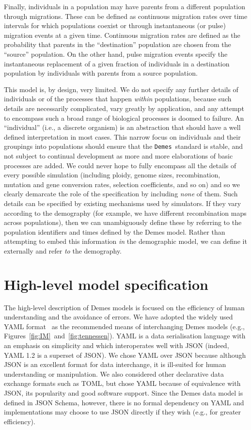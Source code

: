 \documentclass[11pt]{article}
\newcommand{\Demes}[0]{\texttt{Demes}}
\begin{document}
Finally, individuals in a population may have parents from a different
population through migrations. These can be defined as continuous migration
rates over time intervals for which populations coexist or through
instantaneous (or pulse) migration events at a given time. Continuous migration
rates are defined as the probability that parents in the ``destination''
population are chosen from the ``source'' population.
On the other hand, pulse
migration events specify the instantaneous replacement of a given fraction of
individuals in a destination population by individuals with parents from a
source population.

This model is, by design, very limited. We do not specify any further details of
individuals or of the processes that happen \emph{within} populations,
because such details are necessarily complicated, vary greatly by
application, and any attempt to encompass such a broad range of biological
processes is doomed to failure. An ``individual'' (i.e., a discrete
organism) is an abstraction that should have a well defined interpretation
in most cases.
This narrow focus on individuals and their groupings into populations
should ensure that the \Demes\ standard is stable, and not subject to
continual development as more and more elaborations of basic processes
are added. We could never hope to fully encompass all the details
of every possible simulation (including ploidy,
genome sizes, recombination, mutation and gene conversion rates,
selection coefficients, and so on) and so we clearly demarcate the
role of the specification by including \emph{none} of them.
Such details can be specified by existing mechanisms used by
simulators. If they vary according to the demography (for example,
we have different recombination maps across populations), then
we can unambiguously define these by referring to the population
identifiers and times defined by the Demes model. Rather than attempting
to embed this information \emph{in} the demographic model, we
can define it externally and refer \emph{to} the demography.

\section{High-level model specification}\label{sec:appendix-spec}

The high-level description of Demes models is focused on the efficiency of
human understanding and the avoidance of errors. We have adopted the widely
used YAML format~\citep{ben2009yaml} as the recommended means of interchanging
Demes models (e.g., Figures~\ref{fig:IM}~and~\ref{fig:tennessen}). YAML is a data
serialisation language with an emphasis on simplicity and which interoperates well
with JSON (indeed, YAML 1.2 is a superset of JSON). We chose YAML over JSON
because although JSON is an excellent format for data interchange, it is
ill-suited for human understanding or manipulation. We also considered other
declarative data exchange formats such as TOML,
but chose YAML because of equivalence with JSON,
its popularity and good software support.
Since the Demes data model is defined in JSON Schema,
however, there is no formal dependency on YAML and implementations may choose
to use JSON directly if they wish (e.g., for greater efficiency).
\end{document}
